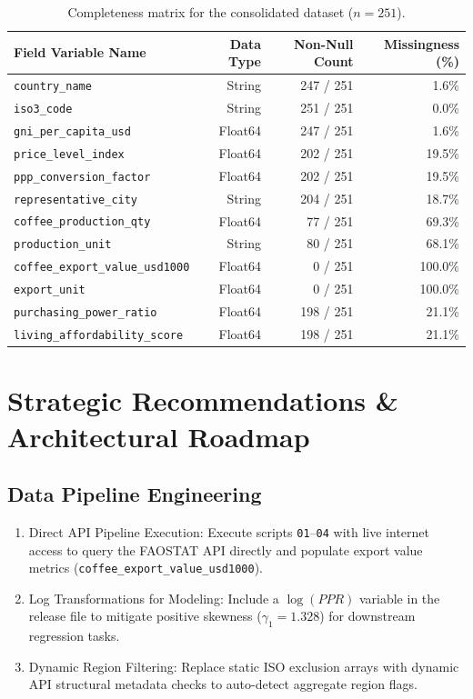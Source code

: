 \documentclass[11pt,a4paper]{article}
\begin{document}
\begin{table}[h]
\centering
\small
\begin{tabular}{@{}lrrr@{}}
\toprule
\textbf{Field Variable Name} & \textbf{Data Type} & \textbf{Non-Null Count} & \textbf{Missingness (\%)} \\
\midrule
\texttt{country\_name} & String & 247 / 251 & 1.6\% \\
\texttt{iso3\_code} & String & 251 / 251 & 0.0\% \\
\texttt{gni\_per\_capita\_usd} & Float64 & 247 / 251 & 1.6\% \\
\texttt{price\_level\_index} & Float64 & 202 / 251 & 19.5\% \\
\texttt{ppp\_conversion\_factor} & Float64 & 202 / 251 & 19.5\% \\
\texttt{representative\_city} & String & 204 / 251 & 18.7\% \\
\texttt{coffee\_production\_qty} & Float64 & 77 / 251 & 69.3\% \\
\texttt{production\_unit} & String & 80 / 251 & 68.1\% \\
\texttt{coffee\_export\_value\_usd1000} & Float64 & 0 / 251 & 100.0\% \\
\texttt{export\_unit} & Float64 & 0 / 251 & 100.0\% \\
\texttt{purchasing\_power\_ratio} & Float64 & 198 / 251 & 21.1\% \\
\texttt{living\_affordability\_score} & Float64 & 198 / 251 & 21.1\% \\
\bottomrule
\end{tabular}
\caption{Completeness matrix for the consolidated dataset ($n=251$).}
\label{tab:completeness}
\end{table}


\section{Strategic Recommendations \& Architectural Roadmap}


\subsection{Data Pipeline Engineering}
\begin{enumerate}[leftmargin=1.5em]
    \item Direct API Pipeline Execution: Execute scripts \texttt{01}--\texttt{04} with live internet access to query the FAOSTAT API directly and populate export value metrics (\texttt{coffee\_export\_value\_usd1000}).
    \item Log Transformations for Modeling: Include a $\log(PPR)$ variable in the release file to mitigate positive skewness ($\gamma_1 = 1.328$) for downstream regression tasks.
    \item Dynamic Region Filtering: Replace static ISO exclusion arrays with dynamic API structural metadata checks to auto-detect aggregate region flags.
\end{enumerate}
\end{document}
